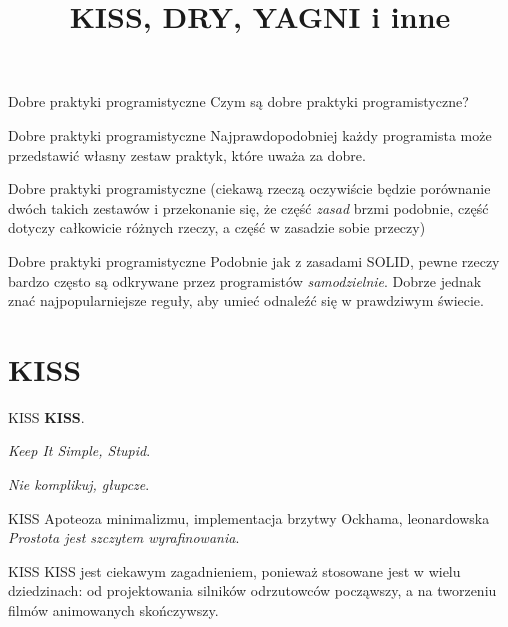 

\title{KISS, DRY, YAGNI i inne}



\begin{frame}{Dobre praktyki programistyczne}
	Czym są dobre praktyki programistyczne?
\end{frame}

\begin{frame}{Dobre praktyki programistyczne}
	Najprawdopodobniej każdy programista może przedstawić własny zestaw praktyk, które uważa za dobre.
\end{frame}

\begin{frame}{Dobre praktyki programistyczne}
	(ciekawą rzeczą oczywiście będzie porównanie dwóch takich zestawów i przekonanie się, że część \emph{zasad} brzmi podobnie, część dotyczy całkowicie różnych rzeczy, a część w zasadzie sobie przeczy)
\end{frame}

\begin{frame}{Dobre praktyki programistyczne}
	Podobnie jak z zasadami SOLID, pewne rzeczy bardzo często są odkrywane przez programistów \emph{samodzielnie}. Dobrze jednak znać najpopularniejsze reguły, aby umieć odnaleźć się w prawdziwym świecie.
\end{frame}

\section{KISS}

\begin{frame}{KISS}
	\textbf{KISS}.
	
	\emph{Keep It Simple, Stupid}.
	
	\emph{Nie komplikuj, głupcze}.
\end{frame}

\begin{frame}{KISS}
	Apoteoza minimalizmu, implementacja brzytwy Ockhama, leonardowska \emph{Prostota jest szczytem wyrafinowania}.
\end{frame}

\begin{frame}{KISS}
	KISS jest ciekawym zagadnieniem, ponieważ stosowane jest w wielu dziedzinach: od projektowania silników odrzutowców począwszy, a na tworzeniu filmów animowanych skończywszy.
\end{frame}

